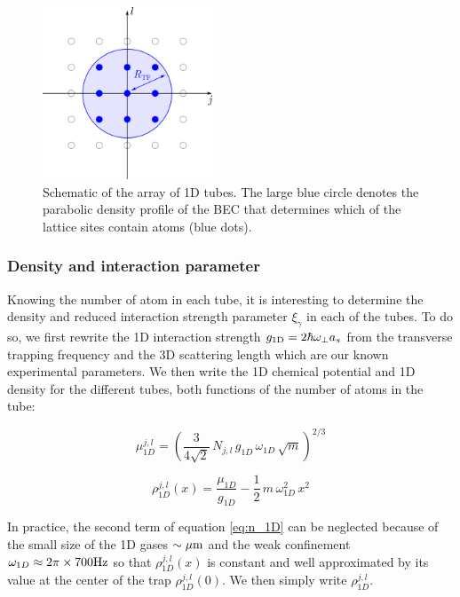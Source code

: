 \begin{figure}
    \centering
    \includegraphics[width=0.45\textwidth]{Fig/Chapter5/tubes_occupes.png}
    \caption[Schematic of the array of 1D tubes]{Schematic of the array of 1D tubes. The large blue circle denotes the parabolic density profile of the BEC that determines which of the lattice sites contain atoms (blue dots).}
    \label{fig:my_label}
\end{figure}

\subsubsection{Density and interaction parameter}


Knowing the number of atom in each tube, it is interesting to determine the density and reduced interaction strength parameter $\xi_{\gamma}$ in each of the tubes. To do so, we first rewrite the 1D interaction strength $g_{\rm{1D}} = 2 \hbar \omega_{\perp} a_s$ \cite{olshanii1998atomic} from the transverse trapping frequency and the 3D scattering length which are our known experimental parameters. We then write the 1D chemical potential and 1D density for the different tubes, both functions of the number of atoms in the tube:

\begin{equation}
    \mu_{1D}^{j,l} = \left( \frac{3}{4 \sqrt{2}} \, N_{j,l}\,  g_{1D} \, \omega_{1D}\,  \sqrt{m} \right)^{2/3}
\end{equation}

\begin{equation}\label{eq:n_1D}
    \rho_{1D}^{j,l}(x) = \frac{\mu_{1D}}{g_{1D}} - \frac{1}{2} \, m \, \omega_{1D}^2 \, x^2
\end{equation}

\noindent In practice, the second term of equation \ref{eq:n_1D} can be neglected because of the small size of the 1D gases $\sim \mu \rm{m}$ and the weak confinement $\omega_{1D} \approx 2 \pi \times 700 \rm{Hz}$ so that $\rho_{1D}^{j,l}(x)$ is constant and well approximated by its value at the center of the trap $\rho_{1D}^{j,l}(0)$. We then simply write $\rho_{1D}^{j,l}$.

